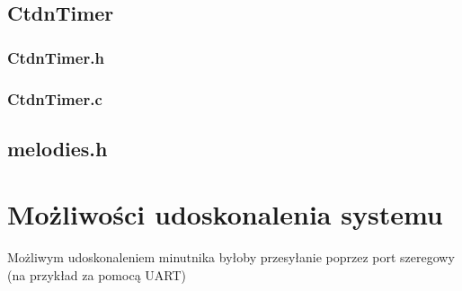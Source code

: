\documentclass[fleqn]{article}
\begin{document}
\noindent\begin{minipage}[t]{.45\textwidth}
\subsection{CtdnTimer}
\subsubsection{CtdnTimer.h}

\subsubsection{CtdnTimer.c}

\end{minipage}\hfill
\noindent\begin{minipage}[t]{.45\textwidth}
\subsection{melodies.h}

\end{minipage}\hfill

\pagebreak

\section{Możliwości udoskonalenia systemu}
Możliwym udoskonaleniem minutnika byłoby przesyłanie poprzez port szeregowy (na przykład za pomocą UART)
\end{document}
